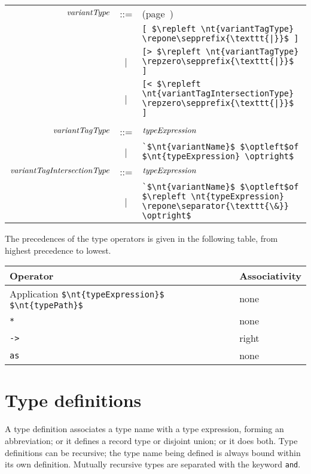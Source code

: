 \begin{center}
\begin{tabular}{rcl}
$\textit{\rmfamily variantType}$ & ::= & \hfill(page~\pageref{keyword:polymorphic-variants})\\
&   & \hbox{\lstinline/[ $\repleft \nt{variantTagType} \repone\sepprefix{\texttt{|}}$ ]/}\\
& | & \hbox{\lstinline/[> $\repleft \nt{variantTagType} \repzero\sepprefix{\texttt{|}}$ ]/}\\
& | & \hbox{\lstinline/[< $\repleft \nt{variantTagIntersectionType} \repzero\sepprefix{\texttt{|}}$ ]/}\\
\\
$\textit{\rmfamily variantTagType}$ & ::= & $\textit{\rmfamily typeExpression}$\\
& | &\hbox{\lstinline/`$\nt{variantName}$ $\optleft$of $\nt{typeExpression} \optright$/}\\
$\textit{\rmfamily variantTagIntersectionType}$ & ::= & $\textit{\rmfamily typeExpression}$\\
& | &\hbox{\lstinline/`$\nt{variantName}$ $\optleft$of $\repleft \nt{typeExpression} \repone\separator{\texttt{\&}} \optright$/}
\end{tabular}
\end{center}
%
The precedences of the type operators is given in the following table, from highest precedence to lowest.

\begin{center}
\begin{tabular}{|l|l|}
\hline
Operator & Associativity\\
\hline
Application \hbox{\lstinline/$\nt{typeExpression}$ $\nt{typePath}$/} & none\\
\hbox{\lstinline/*/} & none\\
\hbox{\lstinline/->/} & right\\
\hbox{\lstinline/as/} & none\\
\hline
\end{tabular}
\end{center}

\newpage
\section{Type definitions}

A type definition associates a type name with a type expression, forming an abbreviation; or it
defines a record type or disjoint union; or it does both.  Type definitions can be recursive;
the type name being defined is always bound within its own definition.  Mutually recursive types
are separated with the keyword \hbox{\lstinline/and/}.

